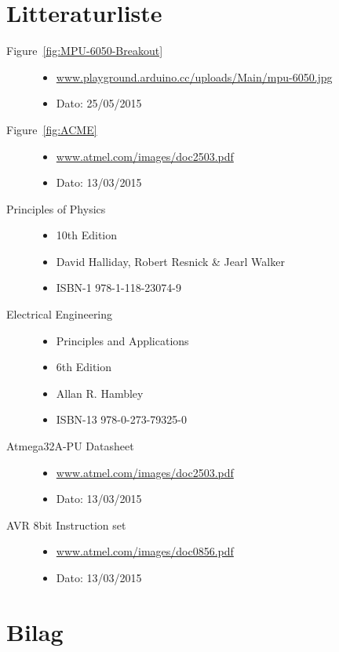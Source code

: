 \section{Litteraturliste}

\begin{description}
	\item[Figure~\ref{fig:MPU-6050-Breakout}] \hfill
		\begin{itemize}
			\item \url{www.playground.arduino.cc/uploads/Main/mpu-6050.jpg}
			\item Dato: 25/05/2015
		\end{itemize}

	\item[Figure~\ref{fig:ACME}] \hfill
		\begin{itemize}
			\item \url{www.atmel.com/images/doc2503.pdf}
			\item Dato: 13/03/2015
		\end{itemize}
		
		\item[Principles of Physics] \hfill
		\begin{itemize}
			\item 10th Edition
			\item David Halliday, Robert Resnick \& Jearl Walker
			\item ISBN-1 978-1-118-23074-9
		\end{itemize}
	\item[Electrical Engineering] \hfill
		\begin{itemize}
			\item Principles and Applications
			\item 6th Edition
			\item Allan R. Hambley
			\item ISBN-13 978-0-273-79325-0
		\end{itemize}
	\item[Atmega32A-PU Datasheet] \hfill
		\begin{itemize}
			\item \url{www.atmel.com/images/doc2503.pdf}
			\item Dato: 13/03/2015
		\end{itemize}
	\item[AVR 8bit Instruction set] \hfill
		\begin{itemize}
			\item \url{www.atmel.com/images/doc0856.pdf}
			\item Dato: 13/03/2015
		\end{itemize}
\end{description}

\section{Bilag}

